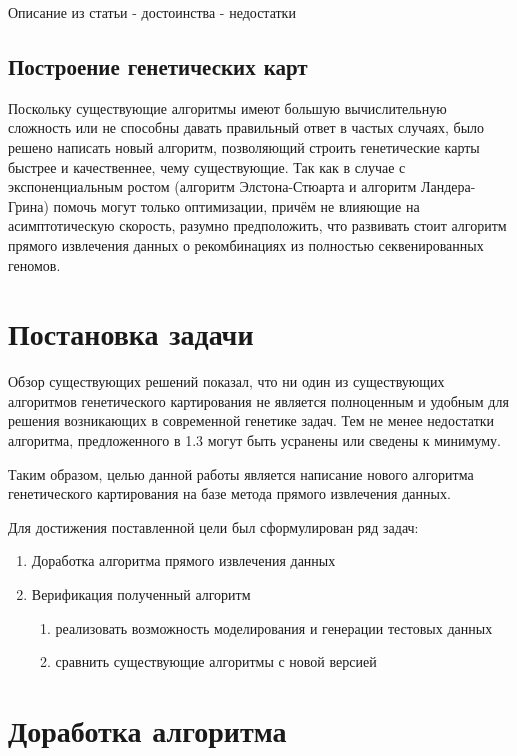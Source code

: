 \documentclass{matmex-diploma-custom}
\begin{document}
Описание из статьи - достоинства - недостатки

\subsection*{Построение генетических карт}

Поскольку существующие алгоритмы имеют большую вычислительную
сложность или не способны давать правильный ответ в частых случаях,
было решено написать новый алгоритм, позволяющий строить генетические
карты быстрее и качественнее, чему существующие. Так как в случае с
экспоненциальным ростом (алгоритм Элстона-Стюарта и алгоритм
Ландера-Грина) помочь могут только оптимизации, причём не влияющие на
асимптотическую скорость, разумно предположить, что развивать стоит
алгоритм прямого извлечения данных о рекомбинациях из полностью
секвенированных геномов.

\section{Постановка задачи}

Обзор существующих решений показал, что ни один из существующих
алгоритмов генетического картирования не является полноценным и
удобным для решения возникающих в современной генетике задач. Тем не
менее недостатки алгоритма, предложенного в 1.3 могут быть усранены
или сведены к минимуму.

Таким образом, целью данной работы является написание нового алгоритма
генетического картирования на базе метода прямого извлечения данных.

Для достижения поставленной цели был сформулирован ряд задач:

\begin{enumerate}
\item Доработка алгоритма прямого извлечения данных
\item Верификация полученный алгоритм
  \begin{enumerate}
  \item реализовать возможность моделирования и генерации тестовых
    данных
  \item сравнить существующие алгоритмы с новой версией
  \end{enumerate}
\end{enumerate}

\section{Доработка алгоритма}
\end{document}
